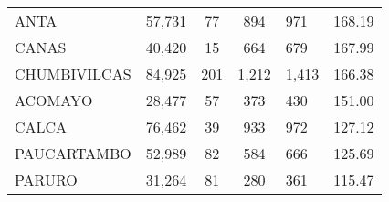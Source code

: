 \begin{tabular}{lrcclr}
	\cellcolor[HTML]{FFFF99}ANTA                                   & 57,731                                                         & 77                                                         & 894                  & 971                                                                 & 168.19                                                                       \\
	\cellcolor[HTML]{FFFF99}CANAS                                  & 40,420                                                         & 15                                                         & 664                  & 679                                                                 & 167.99                                                                       \\
	\cellcolor[HTML]{C6E0B4}CHUMBIVILCAS                           & 84,925                                                         & 201                                                        & 1,212                & 1,413                                                               & 166.38                                                                       \\
	\cellcolor[HTML]{C6E0B4}ACOMAYO                                & 28,477                                                         & 57                                                         & 373                  & 430                                                                 & 151.00                                                                       \\
	\cellcolor[HTML]{C6E0B4}CALCA                                  & 76,462                                                         & 39                                                         & 933                  & 972                                                                 & 127.12                                                                       \\
	\cellcolor[HTML]{C6E0B4}PAUCARTAMBO                            & 52,989                                                         & 82                                                         & 584                  & 666                                                                 & 125.69                                                                       \\
	\cellcolor[HTML]{C6E0B4}PARURO                                 & 31,264                                                         & 81                                                         & 280                  & 361                                                                 & 115.47                                                                       \\

\end{tabular}
